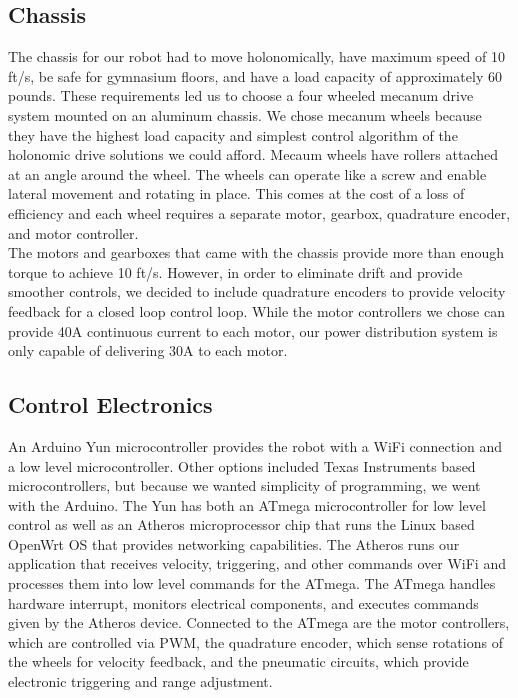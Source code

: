 \documentclass[letterpaper,12pt]{article}
\begin{document}
\subsection{Chassis}
The chassis for our robot had to move holonomically, have maximum speed of 10 ft/s, be safe for gymnasium floors, and have a load capacity of approximately 60 pounds. These requirements led us to choose a four wheeled mecanum drive system mounted on an aluminum chassis. We chose mecanum wheels because they have the highest load capacity and simplest control algorithm of the holonomic drive solutions we could afford. Mecaum wheels have rollers attached at an angle around the wheel. The wheels can operate like a screw and enable lateral movement and rotating in place. This comes at the cost of a loss of efficiency and each wheel requires a separate motor, gearbox, quadrature encoder, and motor controller. \\

The motors and gearboxes that came with the chassis provide more than enough torque to achieve 10 ft/s. However, in order to eliminate drift and provide smoother controls, we decided to include quadrature encoders to provide velocity feedback for a closed loop control loop. While the motor controllers we chose can provide 40A continuous current to each motor, our power distribution system is only capable of delivering 30A to each motor.\\

\subsection{Control Electronics}
An Arduino Yun microcontroller provides the robot with a WiFi connection and a low level microcontroller. Other options included Texas Instruments based microcontrollers, but because we wanted simplicity of programming, we went with the Arduino. The Yun has both an ATmega microcontroller for low level control as well as an Atheros microprocessor chip that runs the Linux based OpenWrt OS that provides networking capabilities. The Atheros runs our application that receives velocity, triggering, and other commands over WiFi and processes them into low level commands for the ATmega. The ATmega handles hardware interrupt, monitors electrical components, and executes commands given by the Atheros device. Connected to the ATmega are the motor controllers, which are controlled via PWM, the quadrature encoder, which sense rotations of the wheels for velocity feedback, and the pneumatic circuits, which provide electronic triggering and range adjustment. \\
\end{document}
